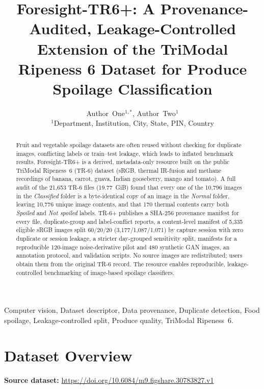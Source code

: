 \documentclass[journal]{IEEEtran}
\begin{document}
\title{Foresight-TR6+: A Provenance-Audited, Leakage-Controlled Extension of the TriModal Ripeness 6 Dataset for Produce Spoilage Classification}

\author{Author~One$^{1,*}$, Author~Two$^{1}$\\[4pt]
\normalsize $^{1}$Department, Institution, City, State, PIN, Country}

\maketitle

\begin{abstract}
Fruit and vegetable spoilage datasets are often reused without checking for duplicate images, conflicting labels or train--test leakage, which leads to inflated benchmark results. Foresight-TR6+ is a derived, metadata-only resource built on the public TriModal Ripeness~6 (TR-6) dataset (sRGB, thermal IR-fusion and methane recordings of banana, carrot, guava, Indian gooseberry, mango and tomato). A full audit of the 21,653 TR-6 files (19.77~GiB) found that every one of the 10,796 images in the \emph{Classified} folder is a byte-identical copy of an image in the \emph{Normal} folder, leaving 10,776 unique image contents, and that 170 thermal contents carry both \emph{Spoiled} and \emph{Not spoiled} labels. TR-6+ publishes a SHA-256 provenance manifest for every file, duplicate-group and label-conflict reports, a content-level manifest of 5,335 eligible sRGB images split 60/20/20 (3,177/1,087/1,071) by capture session with zero duplicate or session leakage, a stricter day-grouped sensitivity split, manifests for a reproducible 120-image noise-derivative pilot and 480 synthetic GAN images, an annotation protocol, and validation scripts. No source images are redistributed; users obtain them from the original TR-6 record. The resource enables reproducible, leakage-controlled benchmarking of image-based spoilage classifiers.
\end{abstract}

\begin{IEEEkeywords}
Computer vision, Dataset descriptor, Data provenance, Duplicate detection, Food spoilage, Leakage-controlled split, Produce quality, TriModal Ripeness~6.
\end{IEEEkeywords}

\section{Dataset Overview}
\noindent\textbf{Source dataset:} \url{https://doi.org/10.6084/m9.figshare.30783827.v1}
\end{document}

